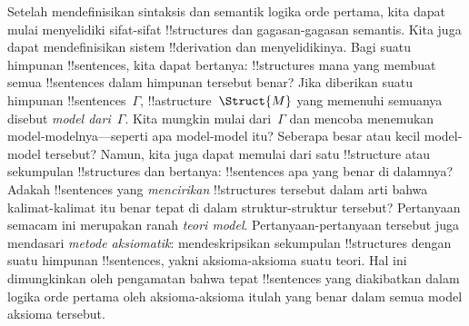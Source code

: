 \documentclass[../../../include/open-logic-section]{subfiles}
\begin{document}


Setelah mendefinisikan sintaksis dan semantik logika orde pertama, kita dapat
mulai menyelidiki sifat-sifat !!{structure}s dan gagasan-gagasan semantis.
Kita juga dapat mendefinisikan sistem !!{derivation} dan menyelidikinya. Bagi
suatu himpunan !!{sentence}s, kita dapat bertanya: !!{structure}s mana yang
membuat semua !!{sentence}s dalam himpunan tersebut benar? Jika diberikan
suatu himpunan !!{sentence}s~$\Gamma$, !!a{structure}~$\Struct{M}$ yang
memenuhi semuanya disebut \emph{model dari~$\Gamma$}. Kita mungkin mulai
dari~$\Gamma$ dan mencoba menemukan model-modelnya---seperti apa model-model
itu? Seberapa besar atau kecil model-model tersebut? Namun, kita juga dapat
memulai dari satu !!{structure} atau sekumpulan !!{structure}s dan bertanya:
!!{sentence}s apa yang benar di dalamnya? Adakah !!{sentence}s yang
\emph{mencirikan} !!{structure}s tersebut dalam arti bahwa kalimat-kalimat
itu benar tepat di dalam struktur-struktur tersebut? Pertanyaan semacam ini
merupakan ranah \emph{teori model}. Pertanyaan-pertanyaan tersebut juga
mendasari \emph{metode aksiomatik}: mendeskripsikan sekumpulan !!{structure}s
dengan suatu himpunan !!{sentence}s, yakni aksioma-aksioma suatu teori. Hal
ini dimungkinkan oleh pengamatan bahwa tepat !!{sentence}s yang diakibatkan
dalam logika orde pertama oleh aksioma-aksioma itulah yang benar dalam semua
model aksioma tersebut.
\end{document}
